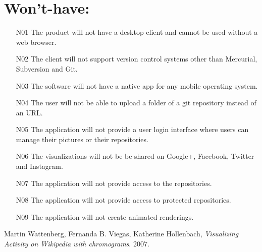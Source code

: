 \documentclass[12pt]{scrartcl}
\begin{document}
\section{Won't-have:}
\begin{enumerate}
\item [N01] The product will not have a desktop client and cannot be used without a web browser.
\item [N02] The client will not support version control systems other than Mercurial, Subversion and Git.
\item [N03] The software will not have a native app for any mobile operating system.
\item [N04] The user will not be able to upload a folder of a git repository instead of an URL.
\item [N05] The application will not provide a user login interface where users can manage their pictures or their repositories.
\item [N06] The visualizations will not be be shared on Google+, Facebook, Twitter and Instagram.
\item [N07] The application will not provide access to the repositories.
\item [N08] The application will not provide access to protected repositories.
\item [N09] The application will not create animated renderings.
\end{enumerate}


\begin{thebibliography}{9}

  Martin Wattenberg, Fernanda B. Viegas, Katherine Hollenbach,  
  \emph{Visualizing Activity on Wikipedia with chromograms}.
  2007.

\end{thebibliography}
\end{document}
